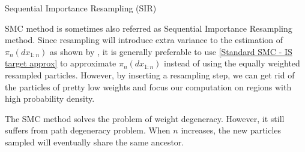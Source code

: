 \documentclass[12pt,a4paper]{article}
\begin{document}
\begin{algorithm}[htb!]
    \caption{Sequential Importance Resampling (SIR)}\label{Alg:SIR}
\end{algorithm}

SMC method is sometimes also referred as Sequential Importance Resampling method. Since resampling will introduce extra variance to the estimation of $\pi_{n}(dx_{1:n})$ as shown by \cite{chopin2004central}, it is generally preferable to use \eqref{Standard SMC - IS target approx} to approximate $\pi_n(dx_{1:n})$ instead of using the equally weighted resampled particles. However, by inserting a resampling step, we can get rid of the particles of pretty low weights and focus our computation on regions with high probability density. 

The SMC method solves the problem of weight degeneracy. However, it still suffers from path degeneracy problem. When $n$ increases, the new particles sampled will eventually share the same ancestor.
\end{document}
